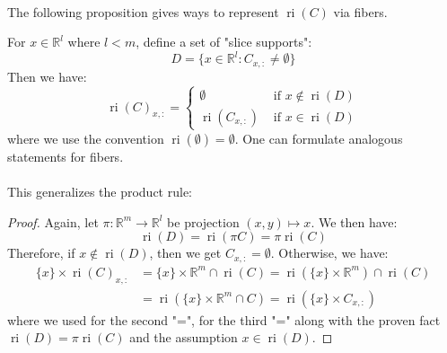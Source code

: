 \paragraph{}The following proposition gives ways to represent $\operatorname{ri}(C)$ via fibers.

\begin{prop}
	\label{prop:012-slice-fiber-rules}
	For $x\in \mathbb{R}^l$ where $l< m$, define a set of "slice supports":
	\[
		D=\{x\in \mathbb{R}^l:C_{x,:}\neq\emptyset\}
	\]
	Then we have:
	\[
		\operatorname{ri}(C)_{x,:}=
		\begin{cases}
			\emptyset                  & \text{ if }x\notin \operatorname{ri}(D) \\
			\operatorname{ri}(C_{x,:}) & \text{ if }x\in \operatorname{ri}(D)
		\end{cases}
	\]
	where we use the convention $\operatorname{ri}(\emptyset)=\emptyset$. One can formulate analogous statements for fibers.
\end{prop}

\paragraph{}This generalizes the product rule:

\begin{proof}
	Again, let $\pi:\mathbb{R}^{m}\to \mathbb{R}^l$ be projection $(x,y)\mapsto x$. We then have:
	\[
		\operatorname{ri}(D)=\operatorname{ri}(\pi C)=\pi \operatorname{ri}(C)
	\]
	Therefore, if $x\notin \operatorname{ri}(D)$, then we get $C_{x,:}=\emptyset$. Otherwise, we have:
	\begin{align*}
		\{x\}\times \operatorname{ri}(C)_{x,:} & = \{x\}\times \mathbb{R}^m\cap \operatorname{ri}(C)                      = \operatorname{ri}(\{x\}\times \mathbb{R}^m)\cap \operatorname{ri}(C) \\
		                                       & = \operatorname{ri}(\{x\}\times \mathbb{R}^m\cap C)                      = \operatorname{ri}(\{x\}\times C_{x,:})
	\end{align*}
	where we used  for the second "=",  for the third "=" along with the proven fact $\operatorname{ri}(D)=\pi \operatorname{ri}(C)$ and the assumption $x\in \operatorname{ri}(D)$.
\end{proof}

